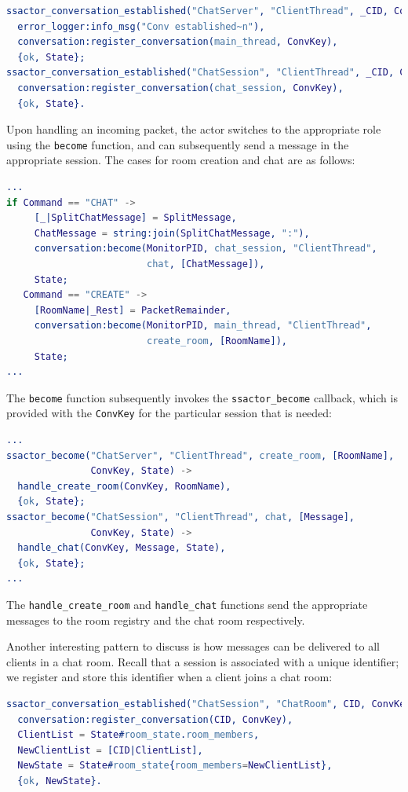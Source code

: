 \documentclass[a4paper]{article}
\begin{document}
\begin{lstlisting}[language=erlang]
ssactor_conversation_established("ChatServer", "ClientThread", _CID, ConvKey, State) ->
  error_logger:info_msg("Conv established~n"),
  conversation:register_conversation(main_thread, ConvKey),
  {ok, State};
ssactor_conversation_established("ChatSession", "ClientThread", _CID, ConvKey, State) ->
  conversation:register_conversation(chat_session, ConvKey),
  {ok, State}.
\end{lstlisting}

Upon handling an incoming packet, the actor switches to the appropriate role using the \texttt{become} function, and can subsequently send a message in the appropriate session. The cases for room creation and chat are as follows:

\begin{lstlisting}[language=erlang]
...
if Command == "CHAT" ->
     [_|SplitChatMessage] = SplitMessage,
     ChatMessage = string:join(SplitChatMessage, ":"),
     conversation:become(MonitorPID, chat_session, "ClientThread",
                         chat, [ChatMessage]),
     State;
   Command == "CREATE" ->
     [RoomName|_Rest] = PacketRemainder,
     conversation:become(MonitorPID, main_thread, "ClientThread",
                         create_room, [RoomName]),
     State;
...
\end{lstlisting}

The \texttt{become} function subsequently invokes the \texttt{ssactor\_become} callback, which is provided with the \texttt{ConvKey} for the particular session that is needed:

\begin{lstlisting}[language=erlang]
...
ssactor_become("ChatServer", "ClientThread", create_room, [RoomName],
               ConvKey, State) ->
  handle_create_room(ConvKey, RoomName),
  {ok, State};
ssactor_become("ChatSession", "ClientThread", chat, [Message],
               ConvKey, State) ->
  handle_chat(ConvKey, Message, State),
  {ok, State};
...
\end{lstlisting}
The \texttt{handle\_create\_room} and \texttt{handle\_chat} functions send the appropriate messages to the room registry and the chat room respectively.

Another interesting pattern to discuss is how messages can be delivered to all clients in a chat room. Recall that a session is associated with a unique identifier; we register and store this identifier when a client joins a chat room:

\begin{lstlisting}[language=erlang]
ssactor_conversation_established("ChatSession", "ChatRoom", CID, ConvKey, State) ->
  conversation:register_conversation(CID, ConvKey),
  ClientList = State#room_state.room_members,
  NewClientList = [CID|ClientList],
  NewState = State#room_state{room_members=NewClientList},
  {ok, NewState}.
\end{lstlisting}
\end{document}
